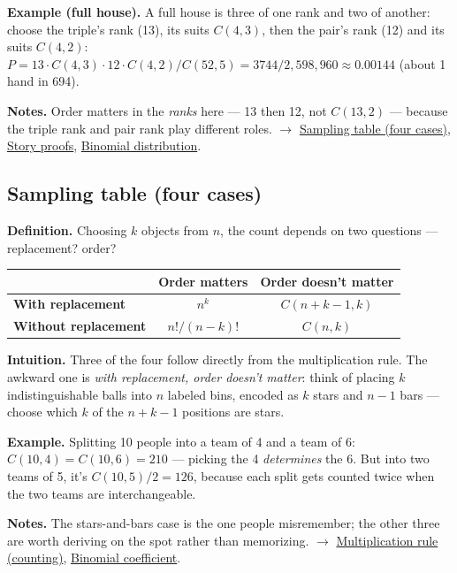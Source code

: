 \documentclass[11pt,a4paper]{article}
\begin{document}
\textbf{Example (full house).} A full house is three of one rank and two of another: choose the triple's rank (13), its suits $C(4,3)$, then the pair's rank (12) and its suits $C(4,2)$:
$P = 13\cdot C(4,3)\cdot 12\cdot C(4,2) / C(52,5) = 3744/2,598,960 \approx  0.00144$ (about 1 hand in 694).

\textbf{Notes.} Order matters in the \textit{ranks} here --- 13 then 12, not $C(13,2)$ --- because the triple rank and pair rank play different roles. $\to$ \hyperref[sec:sampling-table-four-cases]{Sampling table (four cases)}, \hyperref[sec:story-proofs]{Story proofs}, \hyperref[sec:binomial-distribution]{Binomial distribution}.

\subsection{Sampling table (four cases)}\label{sec:sampling-table-four-cases}

\textbf{Definition.} Choosing $k$ objects from $n$, the count depends on two questions --- replacement? order?

\begin{center}\begin{tabular}{@{}lcc@{}}\toprule
 & \textbf{Order matters} & \textbf{Order doesn't matter} \\
\midrule
\textbf{With replacement} & $n^{k}$ & $C(n + k - 1, k)$ \\
\textbf{Without replacement} & $n! / (n-k)!$ & $C(n, k)$ \\
\bottomrule\end{tabular}\end{center}

\textbf{Intuition.} Three of the four follow directly from the multiplication rule. The awkward one is \textit{with replacement, order doesn't matter}: think of placing $k$ indistinguishable balls into $n$ labeled bins, encoded as $k$ stars and $n-1$ bars --- choose which $k$ of the $n+k-1$ positions are stars.

\textbf{Example.} Splitting 10 people into a team of 4 and a team of 6: $C(10,4) = C(10,6) = 210$ --- picking the 4 \textit{determines} the 6. But into two teams of 5, it's $C(10,5)/2 = 126$, because each split gets counted twice when the two teams are interchangeable.

\textbf{Notes.} The stars-and-bars case is the one people misremember; the other three are worth deriving on the spot rather than memorizing. $\to$ \hyperref[sec:multiplication-rule-counting]{Multiplication rule (counting)}, \hyperref[sec:binomial-coefficient]{Binomial coefficient}.
\end{document}
